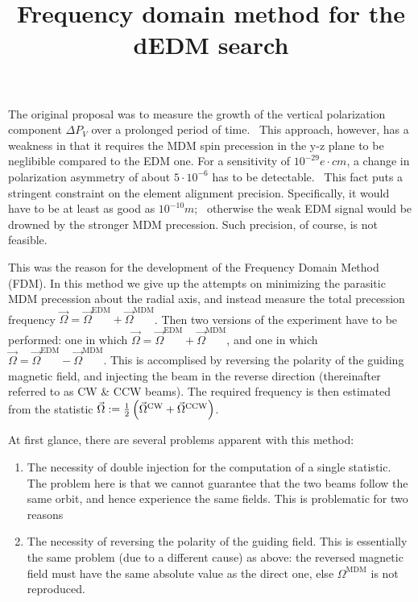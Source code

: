 \documentclass{article}
\newcommand{\W}{\Omega}
\newcommand{\MDM}{^\mathrm{MDM}}
\newcommand{\EDM}{^\mathrm{EDM}}
\newcommand{\CW}{^\mathrm{CW}}
\newcommand{\CCW}{^\mathrm{CCW}}
\begin{document}
\title{Frequency domain method for the dEDM search}
The original proposal was to measure the growth of the vertical polarization component $\Delta P_V$ over a prolonged period of time.~\cite{BNL_proposal} This approach, however, has a weakness in that it requires the MDM spin precession in the y-z plane to be neglibible compared to the EDM one. For a sensitivity of $10^{-29} e\cdot cm$, a change in polarization asymmetry of about $5\cdot 10^{-6}$ has to be detectable.~\cite[p. 18]{BNL_proposal} This fact puts a stringent constraint on the element alignment precision. Specifically, it would have to be at least as good as $10^{-10} m$;~\cite{Senichev:alignment} otherwise the weak EDM signal would be drowned by the stronger MDM precession. Such precision, of course, is not feasible.

This was the reason for the development of the Frequency Domain Method (FDM). In this method we give up the attempts on minimizing the parasitic MDM precession about the radial axis, and instead measure the total precession frequency $\vec\W = \vec\W\EDM + \vec\W\MDM$. Then two versions of the experiment have to be performed: one in which $\vec\W = \vec\W\EDM + \vec\W\MDM$, and one in which $\vec\W = \vec\W\EDM - \vec\W\MDM$. This is accomplised by reversing the polarity of the guiding magnetic field, and injecting the beam in the reverse direction (thereinafter referred to as CW \& CCW beams). The required frequency is then estimated from the statistic $\vec\W := \frac12\bkt{\vec\W\CW + \vec\W\CCW}$.

At first glance, there are several problems apparent with this method:
\begin{enumerate}
\item The necessity of double injection for the computation of a single statistic. The problem here is that we cannot guarantee that the two beams follow the same orbit, and hence experience the same fields. This is problematic for two reasons \label{itm:Injection}
  
  \item The necessity of reversing the polarity of the guiding field. This is essentially the same problem (due to a different cause) as above: the reversed magnetic field must have the same absolute value as the direct one, else $\W\MDM$ is not reproduced. \label{itm:Polarity}
\end{enumerate}
\end{document}
